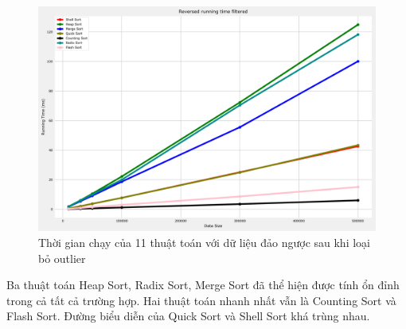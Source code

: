 \begin{figure}[H]
    \centering
    \includegraphics[width=\textwidth]{experimental_result/images/reversed_running_time_filtered.png}
    \caption{Thời gian chạy của 11 thuật toán với dữ liệu đảo ngược sau khi loại bỏ outlier}
    \label{fig:reversed_running_time_filtered}
\end{figure}


Ba thuật toán Heap Sort, Radix Sort, Merge Sort đã thể hiện được tính ổn đỉnh trong cả tất cả trường hợp. Hai thuật toán nhanh nhất vẫn là Counting Sort và Flash Sort. Đường biểu diễn của Quick Sort và Shell Sort khá trùng nhau.







